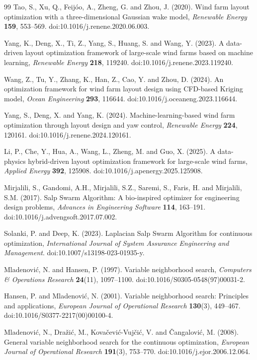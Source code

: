 \documentclass[journal,twoside]{IEEEtran}
\begin{document}
\begin{thebibliography}{99}
Tao, S., Xu, Q., Feij\'oo, A., Zheng, G. and Zhou, J. (2020). Wind farm layout optimization with a three-dimensional Gaussian wake model, \textit{Renewable Energy} \textbf{159}, 553--569. doi:10.1016/j.renene.2020.06.003.

Yang, K., Deng, X., Ti, Z., Yang, S., Huang, S. and Wang, Y. (2023). A data-driven layout optimization framework of large-scale wind farms based on machine learning, \textit{Renewable Energy} \textbf{218}, 119240. doi:10.1016/j.renene.2023.119240.

Wang, Z., Tu, Y., Zhang, K., Han, Z., Cao, Y. and Zhou, D. (2024). An optimization framework for wind farm layout design using CFD-based Kriging model, \textit{Ocean Engineering} \textbf{293}, 116644. doi:10.1016/j.oceaneng.2023.116644.

Yang, S., Deng, X. and Yang, K. (2024). Machine-learning-based wind farm optimization through layout design and yaw control, \textit{Renewable Energy} \textbf{224}, 120161. doi:10.1016/j.renene.2024.120161.

Li, P., Che, Y., Hua, A., Wang, L., Zheng, M. and Guo, X. (2025). A data-physics hybrid-driven layout optimization framework for large-scale wind farms, \textit{Applied Energy} \textbf{392}, 125908. doi:10.1016/j.apenergy.2025.125908.

Mirjalili, S., Gandomi, A.H., Mirjalili, S.Z., Saremi, S., Faris, H. and Mirjalili, S.M. (2017). Salp Swarm Algorithm: A bio-inspired optimizer for engineering design problems, \textit{Advances in Engineering Software} \textbf{114}, 163--191. doi:10.1016/j.advengsoft.2017.07.002.

Solanki, P. and Deep, K. (2023). Laplacian Salp Swarm Algorithm for continuous optimization, \textit{International Journal of System Assurance Engineering and Management}. doi:10.1007/s13198-023-01935-y.

Mladenovi\'c, N. and Hansen, P. (1997). Variable neighborhood search, \textit{Computers \& Operations Research} \textbf{24}(11), 1097--1100. doi:10.1016/S0305-0548(97)00031-2.

Hansen, P. and Mladenovi\'c, N. (2001). Variable neighborhood search: Principles and applications, \textit{European Journal of Operational Research} \textbf{130}(3), 449--467. doi:10.1016/S0377-2217(00)00100-4.

Mladenovi\'c, N., Dra\v{z}i\'c, M., Kova\v{c}evi\'c-Vuj\v{c}i\'c, V. and \v{C}angalovi\'c, M. (2008). General variable neighborhood search for the continuous optimization, \textit{European Journal of Operational Research} \textbf{191}(3), 753--770. doi:10.1016/j.ejor.2006.12.064.


\end{thebibliography}
\end{document}
